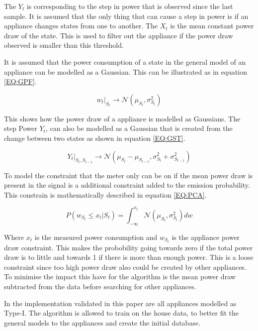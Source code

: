 The $Y_t$ is corresponding to the step in power that is observed since the last sample. It is assumed that the only thing that can cause a step in power is if an appliance changes states from one to another. The $X_t$ is the mean constant power draw of the state. This is used to filter out the appliance if the power draw observed is smaller than this threshold.

It is assumed that the power consumption of a state in the general model of an appliance can be modelled as a Gaussian. This can be illustrated as in equation \ref{EQ:GPF}. 

\begin{equation}
	w_t|_{S_t} \rightarrow \mathcal{N}( \mu_{S_t} , \sigma_{S_t}^2 )
	\label{EQ:GPF}
\end{equation}

This shows how the power draw of a appliance is modelled as Gaussians. The step Power $Y_t$, can also be modelled as a Gaussian that is created from the change between two states as shown in equation \ref{EQ:GST}.

\begin{equation}
	Y_t|_{S_t,S_{t-1}} \rightarrow \mathcal{N}( \mu_{S_t} - \mu_{S_{t-1}} , \sigma_{S_t}^2 + \sigma_{S_{t-1}}^2 )
	\label{EQ:GST}
\end{equation}

To model the constraint that the meter only can be on if the mean power draw is present in the signal is a additional constraint added to the emission probability. This constrain is mathematically described in equation \ref{EQ:PCA}.

\begin{equation}
	P(w_{S_t} \leq x_t | S_t ) = \int_{-\infty}^{x_t}  \mathcal{N}( \mu_{S_t} , \sigma_{S_t}^2 ) dw
	\label{EQ:PCA}
\end{equation}

Where $x_t$ is the measured power consumption and $w_{S_t}$ is the appliance power draw constraint. This makes the probobility going towards zero if the total power draw is to little and towards 1 if there is more than enough power. This is a loose constraint since too high power draw also could be created by other appliances. To minimise the impact this have for the algorithm is the mean power draw subtracted from the data before searching for other appliances. 

In the implementation validated in this paper are all appliances modelled as Type-I. The algorithm is allowed to train on the house data, to better fit the general models to the appliances and create the initial database.

